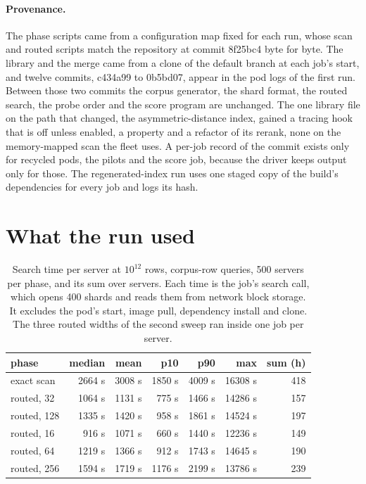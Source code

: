 \documentclass[sigconf, nonacm]{acmart}
\begin{document}
\paragraph{Provenance.} The phase scripts came from a configuration map fixed for each run, whose
scan and routed scripts match the repository at commit 8f25bc4 byte for byte. The library and the
merge came from a clone of the default branch at each job's start, and twelve commits, c434a99 to
0b5bd07, appear in the pod logs of the first run. Between those two commits the corpus generator,
the shard format, the routed search, the probe order and the score program are unchanged. The one
library file on the path that changed, the asymmetric-distance index, gained a tracing hook that
is off unless enabled, a property and a refactor of its rerank, none on the memory-mapped scan the
fleet uses. A per-job record of the commit exists only for recycled pods, the pilots and the score
job, because the driver keeps output only for those. The regenerated-index run uses one staged
copy of the build's dependencies for every job and logs its hash.

\section{What the run used}
\label{sec:cost}

\begin{table}[t]
\caption{Search time per server at $10^{12}$ rows, corpus-row queries, 500 servers per phase, and
its sum over servers. Each time is the job's search call, which opens 400 shards and reads them from
network block storage. It excludes the pod's start, image pull, dependency install and clone. The
three routed widths of the second sweep ran inside one job per server.}
\label{tab:cost}
\centering
\small
\setlength{\tabcolsep}{3.5pt}
\begin{tabular}{lrrrrrr}
\toprule
phase & median & mean & p10 & p90 & max & sum (h) \\
\midrule
exact scan       & 2664 s & 3008 s & 1850 s & 4009 s & 16308 s & 418 \\
routed, 32       & 1064 s & 1131 s &  775 s & 1466 s & 14286 s & 157 \\
routed, 128      & 1335 s & 1420 s &  958 s & 1861 s & 14524 s & 197 \\
routed, 16       &  916 s & 1071 s &  660 s & 1440 s & 12236 s & 149 \\
routed, 64       & 1219 s & 1366 s &  912 s & 1743 s & 14645 s & 190 \\
routed, 256      & 1594 s & 1719 s & 1176 s & 2199 s & 13786 s & 239 \\
\bottomrule
\end{tabular}
\end{table}
\end{document}
